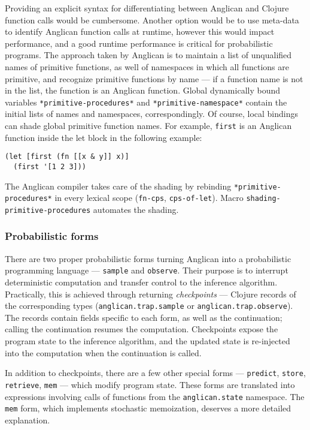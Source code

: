 \documentclass[preprint]{sigplanconf}
\begin{document}
Providing an explicit syntax for differentiating between
Anglican and Clojure function calls would be cumbersome. Another
option would be to use meta-data to identify Anglican function
calls at runtime, however this would impact performance, and
a good runtime performance is critical for probabilistic
programs. The approach taken by Anglican is to maintain a list
of unqualified names of primitive functions, as well of
namespaces in which all functions are primitive, and recognize
primitive functions by name --- if a function name is not in the
list, the function is an Anglican function. Global dynamically
bound variables \texttt{*primitive-procedures*} and
\texttt{*primitive-namespace*} contain the initial lists of
names and namespaces, correspondingly. Of course, local bindings
can shade global primitive function names. For example,
\texttt{first} is an Anglican function inside the let block in the
following example:
\begin{lstlisting}[style=default]
(let [first (fn [[x & y]] x)]
  (first '[1 2 3]))
\end{lstlisting}
The Anglican compiler takes care of the shading by rebinding
\texttt{*primitive-procedures*} in every lexical scope
(\texttt{fn-cps}, \texttt{cps-of-let}). Macro
\texttt{shading-primitive-procedures} automates the shading.

\subsubsection{Probabilistic forms}

There are two proper probabilistic forms turning Anglican into a
probabilistic programming language --- \texttt{sample} and
\texttt{observe}. Their purpose is to interrupt deterministic
computation and transfer control to the inference algorithm.
Practically, this is achieved through returning
\textit{checkpoints} --- Clojure records of the corresponding
types (\texttt{anglican.trap.sample} or
\texttt{anglican.trap.observe}). The records contain fields
specific to each form, as well as the continuation; calling the
continuation resumes the computation. Checkpoints expose the
program state to the inference algorithm, and the updated state
is re-injected into the computation when the continuation is
called. 

In addition to checkpoints, there are a few other special forms
--- \texttt{predict}, \texttt{store}, \texttt{retrieve},
\texttt{mem} --- which modify program state. These forms are
translated into expressions involving calls of functions from the
\texttt{anglican.state} namespace. The \texttt{mem} form, which
implements stochastic memoization, deserves a more detailed
explanation.
\end{document}
